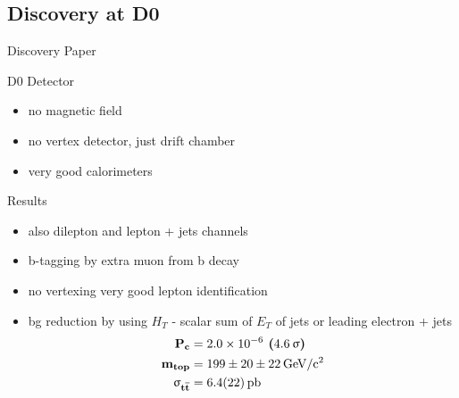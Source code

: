 \subsection{Discovery at D0}
\begin{frame}{Discovery Paper}
	
	
\end{frame}
\begin{frame}{D0 Detector}
	
	\vspace*{-15pt}  \vspace*{-10pt}
	
	\begin{itemize}\itemfill
		\item no magnetic field
		\item no vertex detector, just drift chamber
		\item very good calorimeters
	\end{itemize}
	
\end{frame}
\begin{frame}{Results}
	
	\begin{itemize}\itemfill
		\item also dilepton and lepton + jets channels
		\item b-tagging by extra muon from b decay
		\item no vertexing \ra very good lepton identification
		\item bg reduction by using $H_{T}$ - scalar sum of $E_{T}$ of jets or leading electron + jets
		{\begin{align*} 
			\z{\textbf{P}}_{\z{\textbf{c}}} 	&= \textbf{\SI{2.0e-6}{} (\SI{4.6}{\upsigma})}\\
			\z{\textbf{m}}_{\z{\textbf{top}}} 	&= \textbf{\SI[parse-numbers=false]{199\pm20\pm22}{\giga\electronvolt\per c^2}}\\
			\mathbf{\upsigma}_{\z{\textbf{t}}\overline{\z{\textbf{t}}}} &= \textbf{\SI{6.4\pm2.2}{\pico\barn}}
		\end{align*}}
	\end{itemize}
	
	\vspace*{-12pt}
	
\end{frame}
